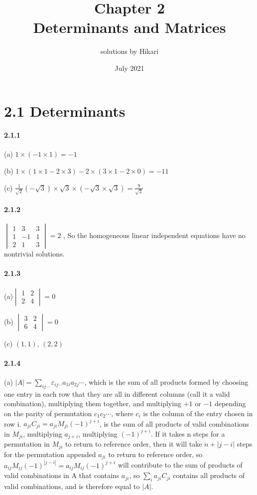 \documentclass[a4paper]{article}
\title{Chapter 2\\Determinants and Matrices}
\author{solutions by Hikari}
\date{July 2021}
\begin{document}
\maketitle

\section*{2.1 Determinants}

\paragraph{2.1.1}
(a) $1\times(-1\times1)=-1$

(b) $1\times(1\times1-2\times3)-2\times(3\times1-2\times0)=-11$

(c) $\frac{1}{\sqrt{2}}(-\sqrt{3})\times\sqrt{3}\times(-\sqrt{3}\times\sqrt{3})=\frac{9}{\sqrt{2}}$

\paragraph{2.1.2}

$\begin{vmatrix}
1&3&3\\
1&-1&1\\
2&1&3
\end{vmatrix}
=2$
, So the homogeneous linear independent equations have no nontrivial solutions.

\paragraph{2.1.3}
(a)$
\begin{vmatrix}
1&2\\
2&4
\end{vmatrix}
=0$

(b)
$
\begin{vmatrix}
3&2\\
6&4
\end{vmatrix}
=0$

(c) $(1,1)$, $(2,2)$

\paragraph{2.1.4}
(a)
$|A|=\sum_{ij\cdots}\varepsilon_{ij\cdots}a_{1i}a_{2j}\cdots$, which is the sum of all products formed by choosing one entry in each row that they are all in different columns (call it a valid combination), multiplying them together, and multiplying $+1$ or $-1$ depending on the parity of permutation $c_1c_2\cdots$, where $c_i$ is the column of the entry chosen in row i. $a_{ji}C_{ji}=a_{ji}M_{ji}(-1)^{j+i}$, is the sum of all products of valid combinations in $M_{ji}$, multiplying $a_{j+i}$, multiplying $(-1)^{j+i}$. If it takes n steps for a permutation in $M_{ji}$ to return to reference order, then it will take $n+|j-i|$ steps for the permutation appended $a_{ji}$ to return to reference order, so $a_{ij}M_{ij}(-1)^{|j-i|}=a_{ij}M_{ij}(-1)^{j+i}$ will contribute to the sum of products of valid combinations in A that contains $a_{ji}$, so $\sum_{i}a_{ji}C_{ji}$ contains all products of valid combinations, and is therefore equal to $|A|$.
\medskip
\end{document}
